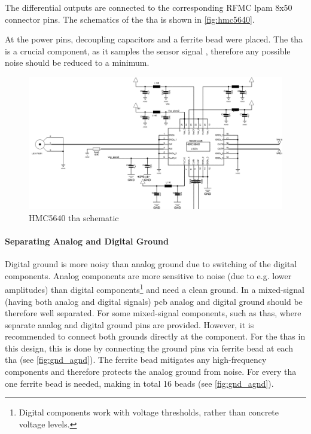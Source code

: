 The differential outputs are connected to the corresponding RFMC \gls{lpam} 8x50 connector pins.
The schematics of the \gls{tha} is shown in \autoref{fig:hmc5640}.

At the power pins, decoupling capacitors and a ferrite bead  were placed. The \gls{tha} is a crucial component, as it samples the sensor signal , therefore any possible noise should be reduced to a minimum.


\begin{figure}[tbh]
	\centering
	\includegraphics[width = \textwidth]{chap/04-theresa/img/schematic/hmc5640}
	\caption[HMC5640 THA schematic]{HMC5640 \gls{tha} schematic}
	\label{fig:hmc5640}
\end{figure}
\paragraph{Separating Analog and Digital Ground}
Digital ground is more noisy than analog ground due to switching of the digital components. 
Analog components are more sensitive to noise (due to e.g. lower amplitudes) than digital components\footnote{Digital components work with voltage thresholds, rather than concrete voltage levels.} and need a clean ground.
In a mixed-signal (having both analog and digital signals) \gls{pcb} analog and digital ground should be therefore well separated.
For some mixed-signal components, such as \glspl{tha}, where separate analog and digital ground pins are provided.
However, it is recommended to connect both grounds directly at the component.
For the \glspl{tha} in this design, this is done by connecting the ground pins via ferrite bead at each \gls{tha} (see \autoref{fig:gnd_agnd}). 
The ferrite bead mitigates any high-frequency components and therefore protects the analog ground from noise.
For every \gls{tha} one ferrite bead is needed, making in total 16 beads (see \autoref{fig:gnd_agnd}).

